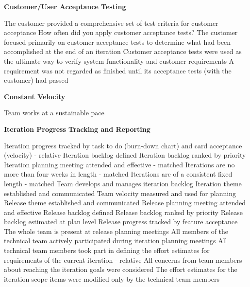 \begin{appendices}
\textbf{Customer/User Acceptance Testing}
\begin{itemize}
	\pam The customer provided a comprehensive set of test criteria for customer acceptance
	\pamr How often did you apply customer acceptance tests?
	\pamr The customer focused primarily on customer acceptance tests to determine what had been accomplished at the end of an iteration
	\pamr Customer acceptance tests were used as the ultimate way to verify system functionality and customer requirements
	\pamr A requirement was not regarded as finished until its acceptance tests (with the customer) had passed
\end{itemize}

\textbf{Constant Velocity}
\begin{itemize}
	\taar Team works at a sustainable pace
\end{itemize}

\textbf{Iteration Progress Tracking and Reporting}
\begin{itemize}
	\taar Iteration progress tracked by task to do (burn-down chart) and card acceptance (velocity) - relative
	\taa Iteration backlog defined
	\taa Iteration backlog ranked by priority
	\taa Iteration planning meeting attended and effective - matched
	\taa Iterations are no more than four weeks in length - matched
	\taa Iterations are of a consistent fixed length - matched
	\taar Team develops and manages iteration backlog
	\taar Iteration theme established and communicated %
	\taar Team velocity measured and used for planning
	\taar Release theme established and communicated 
	\taar Release planning meeting attended and effective 
	\taar Release backlog defined 
	\taar Release backlog ranked by priority 
	\taar Release backlog estimated at plan level 
	\taar Release progress tracked by feature acceptance
	\taar The whole team is present at release planning meetings
	\pamr All members of the technical team actively participated during iteration planning meetings
	\pamr All technical team members took part in defining the effort estimates for 
requirements of the current iteration - relative
	\pamr All concerns from team members about reaching the iteration goals were considered
	\pamr The effort estimates for the iteration scope items were modified only by the  technical team members %
\end{itemize}


\end{appendices}
